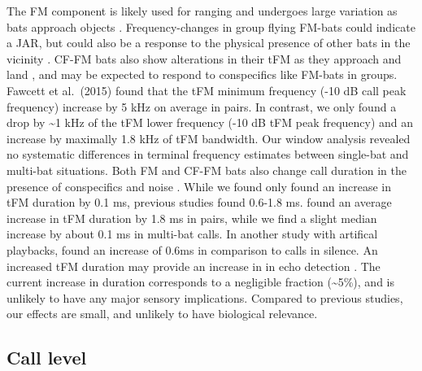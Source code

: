 \documentclass[
]{book}
\begin{document}
The FM component is likely used for ranging and undergoes large variation as bats approach objects \citep{Fenton2014}. Frequency-changes in group flying FM-bats could indicate a JAR, but could also be a response to the physical presence of other bats in the vicinity \citep{cvikel2015b, fawcett2015clutter}. CF-FM bats also show alterations in their tFM as they approach and land \citep{tian1997echolocation, schoeppler2018precise, Fenton2014}, and may be expected to respond to conspecifics like FM-bats in groups. Fawcett et al.~(2015) found that the tFM minimum frequency (-10 dB call peak frequency) increase by 5 kHz on average in pairs. In contrast, we only found a drop by \textasciitilde1 kHz of the tFM lower frequency (-10 dB tFM peak frequency) and an increase by maximally 1.8 kHz of tFM bandwidth. Our window analysis revealed no systematic differences in terminal frequency estimates between single-bat and multi-bat situations. Both FM and CF-FM bats also change call duration in the presence of conspecifics and noise \citep[\citet{gomes2020individual}]{cvikel2015b, amichai2015a, fawcett2015echolocation, lu2020echolocating}. While we found only found an increase in tFM duration by 0.1 ms, previous studies found 0.6-1.8 ms. \citet{fawcett2015echolocation} found an average increase in tFM duration by 1.8 ms in pairs, while we find a slight median increase by about 0.1 ms in multi-bat calls. In another study with artifical playbacks, \citet{lu2020echolocating} found an increase of 0.6ms in comparison to calls in silence. An increased tFM duration may provide an increase in in echo detection \citep{amichai2015a, luo2015a}. The current increase in duration corresponds to a negligible fraction (\textasciitilde5\%), and is unlikely to have any major sensory implications. Compared to previous studies, our effects are small, and unlikely to have biological relevance.

\hypertarget{call-level}{%
\subsection{Call level}\label{call-level}}
\end{document}
